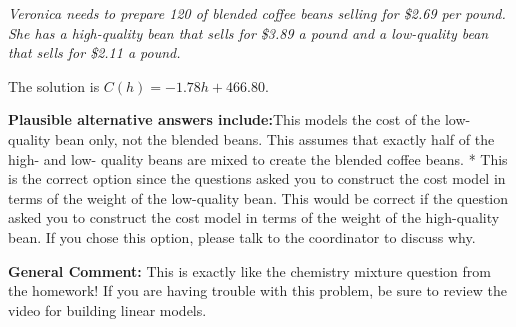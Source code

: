 \documentclass{extbook}[14pt]
\begin{document}
\begin{enumerate}
{\begin{center}
    \textit{ Veronica needs to prepare 120 of blended coffee beans selling for \$2.69 per pound. She has a high-quality bean that sells for \$3.89 a pound and a low-quality bean that sells for \$2.11 a pound. }
\end{center}
The solution is \( C(h) = -1.78 h + 466.80 \).\begin{enumerate}[label=\Alph*.]
\textbf{Plausible alternative answers include:}This models the cost of the low-quality bean only, not the blended beans.
This assumes that exactly half of the high- and low- quality beans are mixed to create the blended coffee beans.
* This is the correct option since the questions asked you to construct the cost model in terms of the weight of the low-quality bean.
This would be correct if the question asked you to construct the cost model in terms of the weight of the high-quality bean.
If you chose this option, please talk to the coordinator to discuss why.
\end{enumerate}

\textbf{General Comment:} This is exactly like the chemistry mixture question from the homework! If you are having trouble with this problem, be sure to review the video for building linear models.
}
\end{enumerate}
\end{document}
